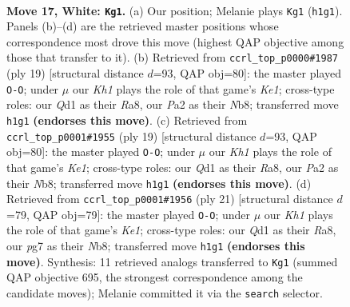 \documentclass[11pt]{article}
\begin{document}
\clearpage

\begin{figure}[p]\centering
\begin{subfigure}{0.46\textwidth}\centering
\resizebox{\linewidth}{!}{%
\newchessgame
\chessboard[
  setfen={r1bnrk2/1ppp1ppp/p2q4/B2P4/4n3/4PNP1/PP3PBP/R2Q1R1K w - - 9 17},
  showmover=false,
  pgfstyle=straightmove, color=movearrow, markmove={h1-g1}
]}
\caption{}
\end{subfigure}\hfill
\begin{subfigure}{0.46\textwidth}\centering
\resizebox{\linewidth}{!}{%
\newchessgame
\chessboard[
  setfen={rn1qk2r/pb3ppp/1pp2b2/3p4/Q2P4/P1N2NP1/1P2PP1P/R3KB1R b KQkq - 0 10},
  showmover=false,
  pgfstyle=straightmove, color=movearrow, markmove={e8-g8}
]}
\caption{}
\end{subfigure}
\\[4pt]
\begin{subfigure}{0.46\textwidth}\centering
\resizebox{\linewidth}{!}{%
\newchessgame
\chessboard[
  setfen={rn1qk2r/pb3ppp/1pp2b2/3p4/Q2P4/P1N2NP1/1P2PP1P/R3KB1R b KQkq - 0 10},
  showmover=false,
  pgfstyle=straightmove, color=movearrow, markmove={e8-g8}
]}
\caption{}
\end{subfigure}\hfill
\begin{subfigure}{0.46\textwidth}\centering
\resizebox{\linewidth}{!}{%
\newchessgame
\chessboard[
  setfen={rn1qk2r/pb3p1p/1pp2bp1/3p4/Q2P4/P1N2NP1/1P2PPBP/R3K2R b KQkq - 1 11},
  showmover=false,
  pgfstyle=straightmove, color=movearrow, markmove={e8-g8}
]}
\caption{}
\end{subfigure}
\caption{\textbf{Move 17, White: \texttt{Kg1}.} (a) Our position; Melanie plays \texttt{Kg1} (\texttt{h1g1}). Panels (b)--(d) are the retrieved master positions whose correspondence most drove this move (highest QAP objective among those that transfer to it). (b) Retrieved from \texttt{ccrl\_top\_p0000\#1987} (ply 19) [structural distance $d$=93, QAP obj=80]: the master played \texttt{O-O}; under $\mu$ our \emph{Kh1} plays the role of that game's \emph{Ke1}; cross-type roles: our \emph{Q}d1 as their \emph{R}a8, our \emph{P}a2 as their \emph{N}b8; transferred move \texttt{h1g1} \textbf{(endorses this move)}. (c) Retrieved from \texttt{ccrl\_top\_p0001\#1955} (ply 19) [structural distance $d$=93, QAP obj=80]: the master played \texttt{O-O}; under $\mu$ our \emph{Kh1} plays the role of that game's \emph{Ke1}; cross-type roles: our \emph{Q}d1 as their \emph{R}a8, our \emph{P}a2 as their \emph{N}b8; transferred move \texttt{h1g1} \textbf{(endorses this move)}. (d) Retrieved from \texttt{ccrl\_top\_p0001\#1956} (ply 21) [structural distance $d$=79, QAP obj=79]: the master played \texttt{O-O}; under $\mu$ our \emph{Kh1} plays the role of that game's \emph{Ke1}; cross-type roles: our \emph{Q}d1 as their \emph{R}a8, our \emph{p}g7 as their \emph{N}b8; transferred move \texttt{h1g1} \textbf{(endorses this move)}. Synthesis: 11 retrieved analogs transferred to \texttt{Kg1} (summed QAP objective 695, the strongest correspondence among the candidate moves); Melanie committed it via the \texttt{search} selector.}
\label{fig:thought-m32}
\end{figure}
\end{document}
